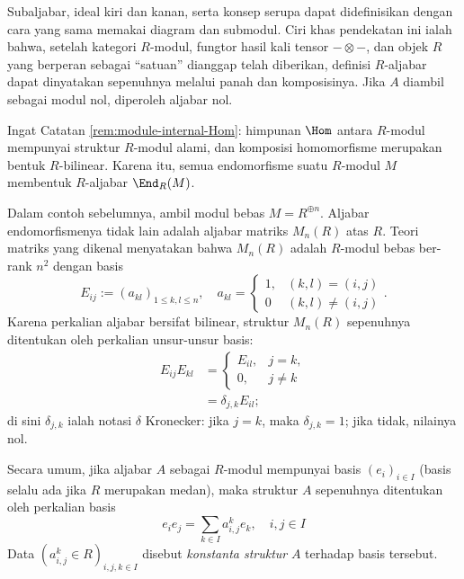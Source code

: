 Subaljabar, ideal kiri dan kanan, serta konsep serupa dapat didefinisikan dengan cara yang sama memakai diagram dan submodul. Ciri khas pendekatan ini ialah bahwa, setelah kategori $R$-modul, fungtor hasil kali tensor $- \otimes -$, dan objek $R$ yang berperan sebagai ``satuan'' dianggap telah diberikan, definisi $R$-aljabar dapat dinyatakan sepenuhnya melalui panah dan komposisinya. Jika $A$ diambil sebagai modul nol, diperoleh aljabar nol.

\begin{example}
	Ingat Catatan \ref{rem:module-internal-Hom}: himpunan $\Hom$ antara $R$-modul mempunyai struktur $R$-modul alami, dan komposisi homomorfisme merupakan bentuk $R$-bilinear. Karena itu, semua endomorfisme suatu $R$-modul $M$ membentuk $R$-aljabar $\End_R(M)$.
\end{example}

\begin{example}\label{eg:matrix-algebra-1}
	Dalam contoh sebelumnya, ambil modul bebas $M = R^{\oplus n}$. Aljabar endomorfismenya tidak lain adalah aljabar matriks $M_n(R)$ atas $R$. Teori matriks yang dikenal menyatakan bahwa $M_n(R)$ adalah $R$-modul bebas ber-rank $n^2$ dengan basis
	\[ E_{ij} := (a_{kl})_{1 \leq k,l \leq n}, \quad a_{kl} = \begin{cases} 1, & (k,l)=(i,j) \\ 0 & (k,l) \neq (i,j) \end{cases}. \]
	Karena perkalian aljabar bersifat bilinear, struktur $M_n(R)$ sepenuhnya ditentukan oleh perkalian unsur-unsur basis:
	\begin{equation}\label{eqn:E_ij}\begin{aligned}
		E_{ij} E_{kl} & = \begin{cases} E_{il}, & j=k, \\ 0, & j \neq k \end{cases} \\
		& = \delta_{j,k} E_{il};
	\end{aligned}\end{equation}
	di sini $\delta_{j,k}$ ialah notasi $\delta$ Kronecker: jika $j=k$, maka $\delta_{j,k}=1$; jika tidak, nilainya nol.
\end{example}

Secara umum, jika aljabar $A$ sebagai $R$-modul mempunyai basis $(e_i)_{i \in I}$ (basis selalu ada jika $R$ merupakan medan), maka struktur $A$ sepenuhnya ditentukan oleh perkalian basis
\[ e_i e_j = \sum_{k \in I} a^k_{i,j} e_k, \quad i,j \in I  \]
Data $(a^k_{i,j} \in R)_{i,j,k \in I}$ disebut \emph{konstanta struktur} $A$ terhadap basis tersebut.

